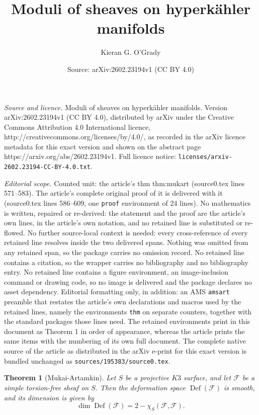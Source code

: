 \documentclass[10pt,a4paper]{amsart}
\title{Moduli of sheaves on hyperk\"ahler manifolds}
\author{Kieran G. O'Grady}
\date{Source: arXiv:2602.23194v1 (CC BY 4.0)}
\newtheorem{thm}{Theorem}
\DeclareMathOperator{\Def}{Def}
\def\cF{\mathcal{F}}
\begin{document}
\maketitle

\noindent\emph{Source and licence.} Moduli of sheaves on hyperk\"ahler manifolds. Version arXiv:2602.23194v1 (CC BY 4.0), distributed by arXiv under the Creative Commons Attribution 4.0 International licence, http://creativecommons.org/licenses/by/4.0/, as recorded in the arXiv licence metadata for this exact version and shown on the abstract page https://arxiv.org/abs/2602.23194v1. Full licence notice: \texttt{licenses/arxiv-2602.23194-CC-BY-4.0.txt}.\par\smallskip

\noindent\textit{Editorial scope.} Counted unit: the article's thm thm:mukart (source0.tex lines 571--583). The article's complete original proof of it is delivered with it (source0.tex lines 586--609, one \texttt{proof} environment of 24 lines). No mathematics is written, repaired or re-derived: the statement and the proof are the article's own lines, in the article's own notation, and no retained line is substituted or re-flowed.  No further source-local context is needed: every cross-reference of every retained line resolves inside the two delivered spans.  Nothing was omitted from any retained span, so the package carries no omission record.  No retained line contains a citation, so the wrapper carries no bibliography and no bibliography entry.  No retained line contains a figure environment, an image-inclusion command or drawing code, so no image is delivered and the package declares no asset dependency.  Editorial formatting only, in addition: an AMS \texttt{amsart} preamble that restates the article's own declarations and macros used by the retained lines, namely the environments \texttt{thm} on separate counters, together with the standard packages those lines need.  The retained environments print in this document as Theorem 1 in order of appearance, whereas the article prints the same items with the numbering of its own full document.  The complete native source of the article as distributed in the arXiv e-print for this exact version is bundled unchanged as \texttt{sources/195383/source0.tex}.
\begin{thm}[Mukai-Artamkin]\label{thm:mukart}
%
Let $S$ be  a projective $K3$ surface, and let
$\cF$ be a simple torsion-free sheaf on $S$. Then the deformation space $\Def(\cF)$ is smooth, and its dimension is given by
%
\begin{equation}\label{dimdefk3}
%
\dim\Def(\cF)=2-\chi_S(\cF,\cF).
%
\end{equation}
%
%
\end{thm}
\end{document}
